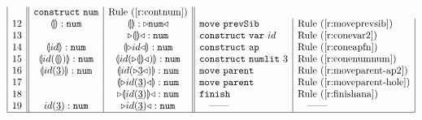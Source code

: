 \documentclass{llncs}
\begin{document}
\begin{figure}[t]
\[\begin{array}{|c||c|c||l|l|}
&
\aConstruct{\fnum{}} & \refrule{\ref{r:contnum}}
\\
12 &
\hhole{} :\tnum{} &
\hhole{} : \zwsel{\tnum{}}
&
\aMove{\dPrev{}} & \refrule{\ref{r:moveprevsib}}
\\
13 &
 &
\zwsel{\hhole{}} : \tnum{}
&
\aConstruct{ \fvar{id}} & \refrule{\ref{r:conevar2}}
\\
14 &
\hhole{\textrm{$id$}} : \tnum{} &
\hhole{\zwsel{{\textrm{$id$}}}} : \tnum{}
&
\aConstruct{\fap{}} & \refrule{\ref{r:coneapfn}}
\\
15 &
\hhole{\hap{{{\textrm{$id$}}}}{{\hhole{}}}} : \tnum{}
&
\hhole{\hap{{{\textrm{$id$}}}}{\zwsel{\hhole{}}}} : \tnum{}
&
\aConstruct{\fnumlit{3}} &  \refrule{\ref{r:conenumnum}}
\\
16 &
\hhole{\hap{{{\textrm{$id$}}}}{{\hnum{3}}}} : \tnum{}
&
\hhole{\hap{{{\textrm{$id$}}}}{\zwsel{\hnum{3}}}} : \tnum{}
&
\aMove{\dParent{}} &  \refrule{\ref{r:moveparent-ap2}}
\\
17 &
&
\hhole{\zwsel{\hap{{{\textrm{$id$}}}}{{\hnum{3}}}}} : \tnum{}
&
\aMove{\dParent{}} &  \refrule{\ref{r:moveparent-hole}}
\\
18 &
&
\zwsel{\hhole{{\hap{{{\textrm{$id$}}}}{{\hnum{3}}}}}} : \tnum{}
&
\aFinish &  \refrule{\ref{r:finishana}}
\\
19 &
{\hap{{{\textrm{$id$}}}}{{\hnum{3}}}} : \tnum{}
&
\zwsel{{{\hap{{{\textrm{$id$}}}}{{\hnum{3}}}}}} : \tnum{}
&
\quad\textrm{---{}---} & \quad\textrm{---{}---}
\\
\hline


\end{array}\]
\end{figure}
\end{document}
